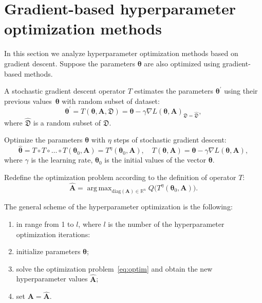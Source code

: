 \documentclass[smallcondensed]{svjour3}
\DeclareMathOperator*{\argmax}{arg\,max}
\begin{document}
\section{Gradient-based hyperparameter optimization methods}
\label{gbhom}
In this section we analyze hyperparameter optimization methods based on gradient descent. Suppose the parameters $\boldsymbol{\theta}$ are also optimized using gradient-based methods. 

\begin{definition}
A stochastic gradient descent operator $T$ estimates the parameters $\boldsymbol{\theta}^\prime$ using their previous values~$\boldsymbol{\theta}$ with random subset of dataset:
\[
	\boldsymbol{\theta}^\prime = T(\boldsymbol{\theta}, \mathbf{A}, \mathfrak{D}) = \boldsymbol{\theta} - \gamma \nabla L(\boldsymbol{\theta}, \mathbf{A})_{\mathfrak{D} = \hat{\mathfrak{D}}},
\]
where $\hat{\mathfrak{D}}$ is a random subset of $\mathfrak{D}$.
\end{definition}

Optimize the parameters  $\boldsymbol{\theta}$ with $\eta$ steps of stochastic gradient descent:
\begin{equation}
\label{eq:gd}
	 \hat{\boldsymbol{\theta}} = T \circ T \circ \dots \circ T(\boldsymbol{\theta}_0, \mathbf{A}) = T^\eta(\boldsymbol{\theta}_0, \mathbf{A}), \quad 	T(\boldsymbol{\theta}, \mathbf{A}) =\boldsymbol{\theta} - \gamma \nabla L(\boldsymbol{\theta}, \mathbf{A}), 
\end{equation}
where $\gamma$ is the learning rate, $\boldsymbol{\theta}_0$ is the initial values of the vector $\boldsymbol{\theta}$. 

Redefine the optimization problem according to the definition of operator $T$:
\begin{equation}
\label{eq:optim}
	\hat{\mathbf{A}} = \argmax_{\text{diag}(\mathbf{A}) \in \mathbb{R}^n} Q\bigl( T^\eta(\boldsymbol{\theta}_0, \mathbf{A})\bigr).
\end{equation}

The general scheme of the hyperparameter optimization is the following:
\begin{enumerate}
\item in range from 1 to  $l$, where $l$ is the number of the hyperparameter optimization iterations:
\item initialize parameters $\boldsymbol{\theta}$;
\item solve the optimization problem~\eqref{eq:optim} and obtain the new hyperparameter values $\hat{\mathbf{A}}$;
\item set $\mathbf{A} = \hat{\mathbf{A}}$.
\end{enumerate}
\end{document}
